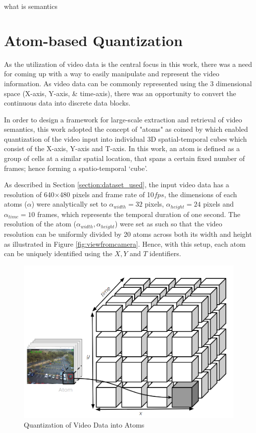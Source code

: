 what is semantics


\section{Atom-based Quantization}
\label{section:atoms}

As the utilization of video data is the central focus in this work, there was a need for coming up with a way to easily manipulate and represent the video information. As video data can be commonly represented using the 3 dimensional space (X-axis, Y-axis, \& time-axis), there was an opportunity to convert the continuous data into discrete data blocks.     


In order to design a framework for large-scale extraction and retrieval of video semantics, this work adopted the concept of "atoms" as coined by \cite{castanon2016retrieval} which enabled quantization of the video input into individual 3D spatial-temporal cubes which consist of the X-axis, Y-axis and T-axis. In this work, an atom is defined as a group of cells at a similar spatial location, that spans a certain fixed number of frames; hence forming a spatio-temporal `cube'.

As described in Section \ref{section:dataset_used}, the input video data has a resolution of 640$\times$480 pixels and frame rate of 10$fps$, the dimensions of each atoms ($\alpha$) were analytically set to $\alpha_{width}=32$ pixels, $\alpha_{height}=24$ pixels and $\alpha_{time}=10$ frames, which represents the temporal duration of one second. The resolution of the atom ($\alpha_{width},\alpha_{height}$) were set as such so that the video resolution can be uniformly divided by 20 atoms across both its width and height as illustrated in Figure \ref{fig:viewfromcamera}. Hence, with this setup, each atom can be uniquely identified using the $X, Y$ and $T$ identifiers.



\begin{figure}[hbt!]\centering
\includegraphics[width=.7\textwidth]{image/general/atom.PNG}
\caption{Quantization of Video Data into Atoms}
\label{fig:atoms}
\end{figure}

